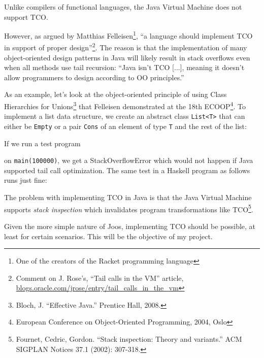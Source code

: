 \documentclass{tufte-handout}
\begin{document}
Unlike compilers of functional languages, the Java Virtual Machine does not support TCO. 

However, as argued by Matthias Felleisen\footnote{One of the creators of the Racket programming language}, ``a language should implement TCO in support of proper design''\footnote{Comment on J. Rose's, ``Tail calls in the VM'' article, \href{https://blogs.oracle.com/jrose/entry/tail_calls_in_the_vm}{blogs.oracle.com/jrose/entry/tail\_calls\_in\_the\_vm}}. The reason is that the implementation of many object-oriented design patterns in Java will likely result in stack overflows even when all methods use tail recursion: ``Java isn't TCO [...], meaning it doesn't allow programmers to design according  
to OO principles.''

As an example, let's look at the object-oriented principle of using Class Hierarchies for Unions\footnote{Bloch, J. ``Effective Java.'' Prentice Hall, 2008.} that Felleisen demonstrated at the 18th ECOOP\footnote{European Conference on Object-Oriented Programming, 2004, Oslo}.
To implement a list data structure, we create an abstract class \verb'List<T>' that can either be \verb'Empty' or a pair \verb'Cons' of an element of type \verb'T' and the rest of the list:


If we run a test program


\noindent on \verb'main(100000)', we get a StackOverflowError which would not happen if Java supported tail call optimization. The same test in a Haskell program as follows runs just fine:


The problem with implementing TCO in Java is that the Java Virtual Machine supports \textit{stack inspection} which invalidates program transformations like TCO\footnote{Fournet, Cedric, Gordon. ``Stack inspection: Theory and variants.'' ACM SIGPLAN Notices 37.1 (2002): 307-318.}.

Given the more simple nature of Joos, implementing TCO should be possible, at least for certain scenarios. This will be the objective of my project.

%






\nocite{*}	%
\end{document}
